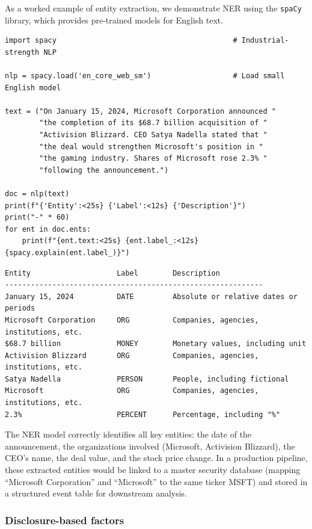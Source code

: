 As a worked example of entity extraction, we demonstrate NER using the \texttt{spaCy} library, which provides pre-trained models for English text.

\begin{verbatim}
import spacy                                         # Industrial-strength NLP

nlp = spacy.load('en_core_web_sm')                   # Load small English model

text = ("On January 15, 2024, Microsoft Corporation announced "
        "the completion of its $68.7 billion acquisition of "
        "Activision Blizzard. CEO Satya Nadella stated that "
        "the deal would strengthen Microsoft's position in "
        "the gaming industry. Shares of Microsoft rose 2.3% "
        "following the announcement.")

doc = nlp(text)
print(f"{'Entity':<25s} {'Label':<12s} {'Description'}")
print("-" * 60)
for ent in doc.ents:
    print(f"{ent.text:<25s} {ent.label_:<12s} {spacy.explain(ent.label_)}")
\end{verbatim}

\begin{verbatim}
Entity                    Label        Description
------------------------------------------------------------
January 15, 2024          DATE         Absolute or relative dates or periods
Microsoft Corporation     ORG          Companies, agencies, institutions, etc.
$68.7 billion             MONEY        Monetary values, including unit
Activision Blizzard       ORG          Companies, agencies, institutions, etc.
Satya Nadella             PERSON       People, including fictional
Microsoft                 ORG          Companies, agencies, institutions, etc.
2.3%                      PERCENT      Percentage, including "%"
\end{verbatim}

The NER model correctly identifies all key entities: the date of the announcement, the organizations involved (Microsoft, Activision Blizzard), the CEO's name, the deal value, and the stock price change. In a production pipeline, these extracted entities would be linked to a master security database (mapping ``Microsoft Corporation'' and ``Microsoft'' to the same ticker MSFT) and stored in a structured event table for downstream analysis.

\subsubsection{Disclosure-based factors}

